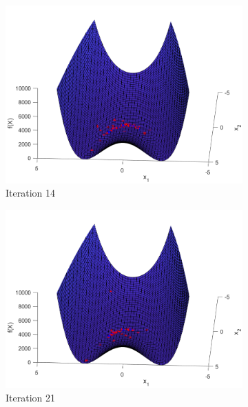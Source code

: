 \begin{figure}
\begin{subfigure}[b]{0.4\textwidth}
    \includegraphics[width=\textwidth]{img/smpl/rosn2d-1-100/loa-iter-14}
    \caption{Iteration 14}
    \label{fig:s3-iter-2}
  \end{subfigure}
  \begin{subfigure}[b]{0.4\textwidth}
    \includegraphics[width=\textwidth]{img/smpl/rosn2d-1-100/loa-iter-21}
    \caption{Iteration 21}
    \label{fig:s3-iter-3}
  \end{subfigure}
  \begin{subfigure}[b]{0.4\textwidth}

\end{subfigure}
\end{figure}
